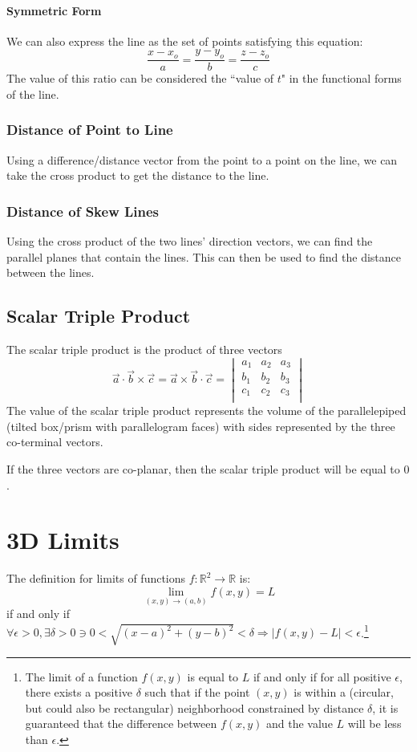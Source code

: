 \documentclass{article}
\newcommand{\vect}[1]{\ensuremath{\overrightarrow{#1}}}
\newcommand{\abs}[1]{\left|#1\right|}
\begin{document}
\paragraph{Symmetric Form}
We can also express the line as the set of points satisfying this equation:
$$
\frac{x-x_o}{a} = \frac{y-y_o}{b} = \frac{z-z_o}{c}
$$
The value of this ratio can be considered the ``value of $t$" in the functional forms of the line.

\subsubsection{Distance of Point to Line}
Using a difference/distance vector from the point to a point on the line, we can take the cross product to get the distance to the line.

\subsubsection{Distance of Skew Lines}
Using the cross product of the two lines' direction vectors, we can find the parallel planes that contain the lines. This can then be used to find the distance between the lines.

\subsection{Scalar Triple Product}
The scalar triple product is the product of three vectors
\[
    \vect{a}\cdot\vect{b}\times\vect{c}=\vect{a}\times\vect{b}\cdot\vect{c} =
    \begin{vmatrix}
        a_1 & a_2 & a_3\\
        b_1 & b_2 & b_3\\
        c_1 & c_2 & c_3\\
    \end{vmatrix}
\]
The value of the scalar triple product represents the volume of the parallelepiped (tilted box/prism with parallelogram faces) with sides represented by the three co-terminal vectors.

If the three vectors are co-planar, then the scalar triple product will be equal to $0$.

\section{3D Limits}
The definition for limits of functions $f: \mathbb{R}^2 \to \mathbb{R}$ is:
\[
    \lim_{(x,y)\to(a,b)}f(x,y) = L
\] if and only if $\forall\epsilon>0, \exists\delta>0 \ni 0<\sqrt{(x-a)^2+(y-b)^2}<\delta \Rightarrow \abs{f(x,y) - L}<\epsilon$.\footnote{The limit of a function $f(x,y)$ is equal to $L$ if and only if for all positive $\epsilon$, there exists a positive $\delta$ such that if the point $(x,y)$ is within a (circular, but could also be rectangular) neighborhood constrained by distance $\delta$, it is guaranteed that the difference between $f(x,y)$ and the value $L$ will be less than $\epsilon$.}
\end{document}
